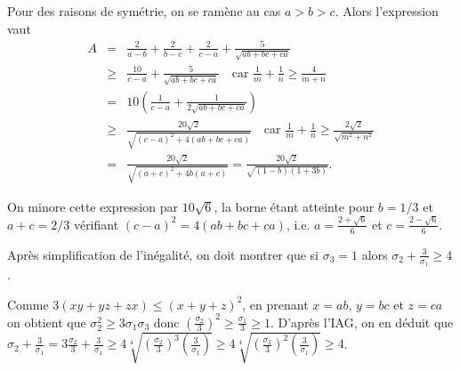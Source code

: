 \begin{sol}
 Pour des raisons de sym\'etrie, on se ram\`ene au cas $a>b>c$. Alors l'expression vaut
\begin{eqnarray*}
 A &=& \frac{2}{a-b}+\frac{2}{b-c}+\frac{2}{c-a}+\frac{5}{\sqrt{ab+bc+ca}}\\
&\geqslant& \frac{10}{c-a}+\frac{5}{\sqrt{ab+bc+ca}}\quad \mbox{car } \frac{1}{m}+\frac{1}{n}\geqslant \frac{4}{m+n}\\
&=&10\left(\frac{1}{c-a}+\frac{1}{2{\sqrt{ab+bc+ca}}}\right)\\
&\geqslant& \frac{20\sqrt{2}}{\sqrt{(c-a)^2+4(ab+bc+ca)}}\quad \mbox{car }\frac{1}{m}+\frac{1}{n}\geqslant \frac{2\sqrt{2}}{\sqrt{m^2+n^2}}\\
&=& \frac{20\sqrt{2}}{\sqrt{{(a+c)^2+4b(a+c)}}}=\frac{20\sqrt{2}}{\sqrt{(1-b)(1+3b)}}.
\end{eqnarray*}

On minore cette expression par $10\sqrt{6}$, la borne \'etant atteinte pour $b=1/3$ et $a+c=2/3$ v\'erifiant $(c-a)^2=4(ab+bc+ca)$, i.e. $a=\frac{2+\sqrt{6}}{6}$ et $c=\frac{2-\sqrt{6}}{6}$.
\end{sol}

\begin{sol}
 Apr\`es simplification de l'in\'egalit\'e, on doit montrer que si $\sigma_3=1$ alors $\sigma_2+\frac{3}{\sigma_1}\geqslant 4$.

Comme $3(xy+yz+zx)\leqslant (x+y+z)^2$, en prenant $x=ab$, $y=bc$ et $z=ca$ on obtient que $\sigma_2^2\geqslant 3\sigma_1\sigma_3$ donc
$(\frac{\sigma_2}{3})^2\geqslant \frac{\sigma_1}{3}\geqslant 1$.
D'apr\`es l'IAG, on en d\'eduit que $\sigma_2+\frac{3}{\sigma_1}=3\frac{\sigma_2}{3}+\frac{3}{\sigma_1}\geqslant 4\sqrt[4]{(\frac{\sigma_ 2}{3})^3(\frac{3}{\sigma_1})}
\geqslant 4\sqrt[4]{(\frac{\sigma_ 2}{3})^2(\frac{3}{\sigma_1})}\geqslant 4$. 
\end{sol}

